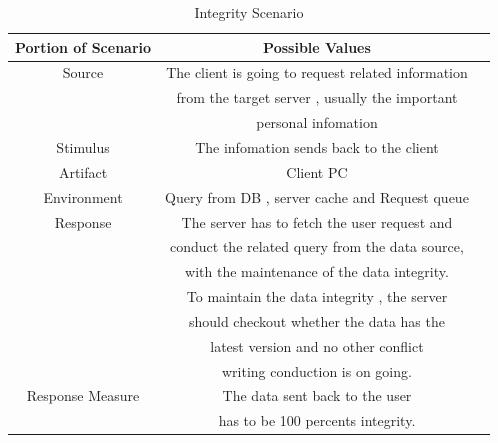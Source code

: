 \documentclass{article}
\begin{document}
	\begin{center}
		\begin{table}[!htb]
		\begin{tabular}{ccc}
		\toprule  
		Portion of Scenario & Possible Values\\
		\midrule 
		Source 				& The client is going to request related information \\
							& from the target server , usually the important \\
							& personal infomation\\
		Stimulus 			& The infomation sends back to the client\\
		Artifact 			& Client PC	\\
		Environment 		& Query from DB , server cache and Request queue\\
		Response 			& The server has to fetch the user request and \\
							& conduct the related query from the data source,\\
							& with the maintenance of the data integrity. \\
							& To maintain the data integrity , the server \\
							& should checkout whether the data has the \\
							& latest version and no other conflict \\
							& writing conduction is on going.\\
		Response Measure 	& The data sent back to the user\\
							& has to be 100 percents integrity.\\

		\bottomrule
		\end{tabular}
		\caption{Integrity Scenario}
		\end{table}
	\end{center}
	
\end{document}
